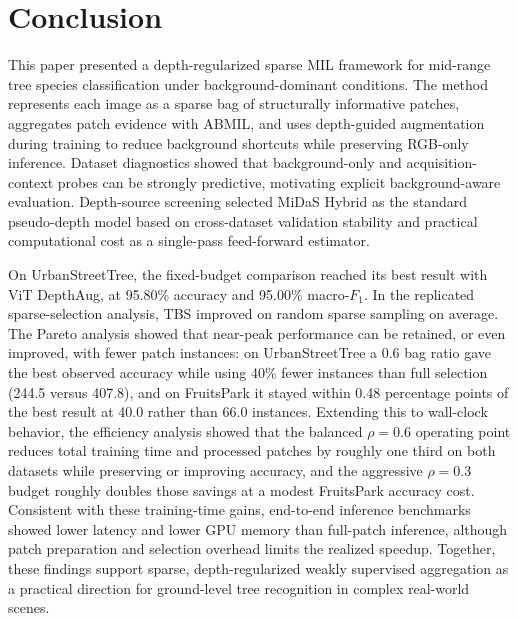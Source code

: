 \documentclass{ieeeaccess}
\begin{document}
\section{Conclusion}
\label{sec:conclusion}

This paper presented a depth-regularized sparse MIL framework for mid-range tree species
classification under background-dominant conditions. The method represents each image as a sparse
bag of structurally informative patches, aggregates patch evidence with ABMIL, and uses depth-guided
augmentation during training to reduce background shortcuts while preserving RGB-only inference.
Dataset diagnostics showed that background-only and acquisition-context probes can be strongly
predictive, motivating explicit background-aware evaluation. Depth-source screening selected MiDaS
Hybrid as the standard pseudo-depth model based on cross-dataset validation stability and practical
computational cost as a single-pass feed-forward estimator.

On UrbanStreetTree, the fixed-budget comparison reached its best result with ViT DepthAug, at
95.80\% accuracy and 95.00\% macro-$F_1$. In the replicated sparse-selection analysis, TBS improved
on random sparse sampling on average. The Pareto analysis showed that near-peak performance can be
retained, or even improved, with fewer patch instances: on UrbanStreetTree a 0.6 bag ratio gave the
best observed accuracy while using 40\% fewer instances than full selection (244.5 versus 407.8),
and on FruitsPark it stayed within 0.48 percentage points of the best result at 40.0 rather than
66.0 instances. Extending this to wall-clock behavior, the efficiency analysis showed that the
balanced $\rho=0.6$ operating point reduces total training time and processed patches by roughly one
third on both datasets while preserving or improving accuracy, and the aggressive $\rho=0.3$ budget
roughly doubles those savings at a modest FruitsPark accuracy cost. Consistent with these training-time
gains, end-to-end inference benchmarks showed lower latency and lower GPU memory than full-patch
inference, although patch preparation and selection overhead limits the realized speedup. Together,
these findings support sparse, depth-regularized weakly supervised aggregation as a practical
direction for ground-level tree recognition in complex real-world scenes.




\EOD
\end{document}
